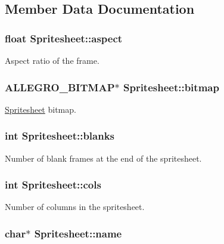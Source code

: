 \subsection{Member Data Documentation}
\hypertarget{structSpritesheet_a85c93c8d80227725374e1581c4c8e049}{
\subsubsection[{aspect}]{\setlength{\rightskip}{0pt plus 5cm}float Spritesheet\+::aspect}}\label{structSpritesheet_a85c93c8d80227725374e1581c4c8e049}
Aspect ratio of the frame. \hypertarget{structSpritesheet_ad31be6e59349586862e6a813ea139bcb}{
\subsubsection[{bitmap}]{\setlength{\rightskip}{0pt plus 5cm}A\+L\+L\+E\+G\+R\+O\+\_\+\+B\+I\+T\+M\+A\+P$\ast$ Spritesheet\+::bitmap}}\label{structSpritesheet_ad31be6e59349586862e6a813ea139bcb}
\hyperlink{structSpritesheet}{Spritesheet} bitmap. \hypertarget{structSpritesheet_a5010b18959949b1c577078f94a810ef3}{
\subsubsection[{blanks}]{\setlength{\rightskip}{0pt plus 5cm}int Spritesheet\+::blanks}}\label{structSpritesheet_a5010b18959949b1c577078f94a810ef3}
Number of blank frames at the end of the spritesheet. \hypertarget{structSpritesheet_a3d512755ce492a35e1816fe026cc37c9}{
\subsubsection[{cols}]{\setlength{\rightskip}{0pt plus 5cm}int Spritesheet\+::cols}}\label{structSpritesheet_a3d512755ce492a35e1816fe026cc37c9}
Number of columns in the spritesheet. \hypertarget{structSpritesheet_a6788d53f825bd74cda7e50e75435befa}{
\subsubsection[{name}]{\setlength{\rightskip}{0pt plus 5cm}char$\ast$ Spritesheet\+::name}}\label{structSpritesheet_a6788d53f825bd74cda7e50e75435befa}
